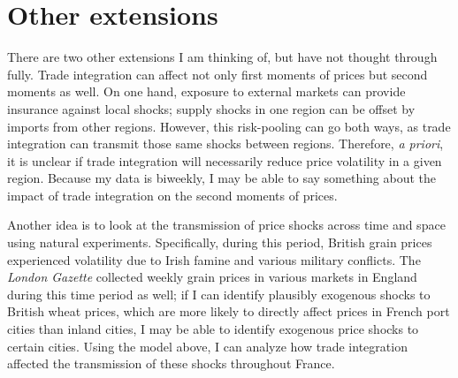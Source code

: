 \documentclass[12pt,twoside]{article}
\begin{document}
\section{Other extensions}

There are two other extensions I am thinking of, but have not thought through fully.
Trade integration can affect not only first moments of prices but second moments as well.
On one hand, exposure to external markets can provide insurance against local shocks; supply shocks in one region can be offset by imports from other regions.
However, this risk-pooling can go both ways, as trade integration can transmit those same shocks between regions.
Therefore, \emph{a priori}, it is unclear if trade integration will necessarily reduce price volatility in a given region.
Because my data is biweekly, I may be able to say something about the impact of trade integration on the second moments of prices.

Another idea is to look at the transmission of price shocks across time and space using natural experiments.
Specifically, during this period, British grain prices experienced volatility due to Irish famine and various military conflicts.
The \emph{London Gazette} collected weekly grain prices in various markets in England during this time period as well; if I can identify plausibly exogenous shocks to British wheat prices, which are more likely to directly affect prices in French port cities than inland cities, I may be able to identify exogenous price shocks to certain cities.
Using the model above, I can analyze how trade integration affected the transmission of these shocks throughout France.
\end{document}
